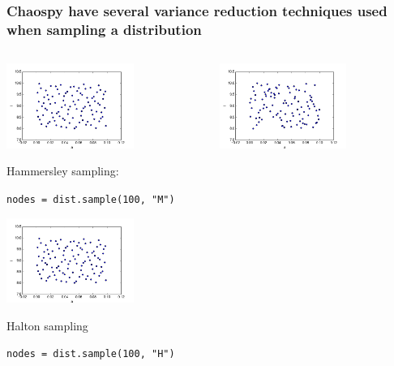 \documentclass[handout]{beamer}
\begin{document}
\begin{frame}[fragile]
 \frametitle{Chaospy have several variance reduction techniques used when sampling a distribution}
 \vspace{-2mm}
 \begin{columns}
     \begin{center}
                \includegraphics[width=0.65\textwidth]{samples_H.png}

                Hammersley sampling:

                \scriptsize
                \verb;nodes = dist.sample(100, "M");
                \normalsize

                \includegraphics[width=0.65\textwidth]{samples_H.png}

                Halton sampling

                \scriptsize
                \verb;nodes = dist.sample(100, "H");
                \normalsize

     \end{center}
     \begin{center}
                  \includegraphics[width=0.65\textwidth]{samples_L.png}


\end{center}
\end{columns}
\end{frame}
\end{document}
